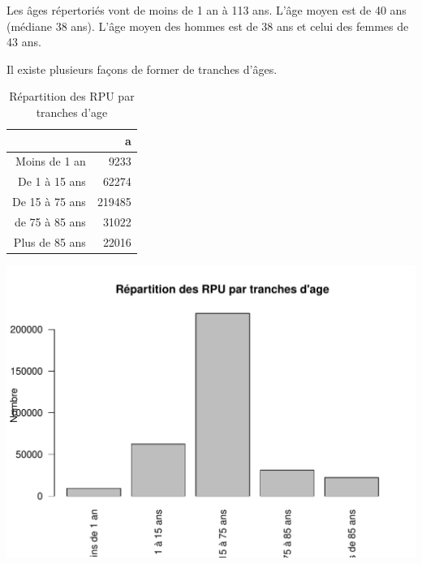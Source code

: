 \documentclass[12pt,english,french,twoside]{book}\usepackage[]{graphicx}\usepackage[]{color}
\makeatletter
\def\maxwidth{ %
  \ifdim\Gin@nat@width>\linewidth
    \linewidth
  \else
    \Gin@nat@width
  \fi
}
\newenvironment{knitrout}{}{} %
\makeatother
\begin{document}
Les âges répertoriés vont de moins de 1 an à 113 ans. L'âge moyen est de 40 ans (médiane 38 ans). L'âge moyen des hommes est de 38 ans et celui des femmes de 43 ans.

Il existe plusieurs façons de former de tranches d'âges.


\begin{table}[ht]
\centering
\begin{tabular}{rr}
  \hline
 & a \\ 
  \hline
Moins de 1 an & 9233 \\ 
  De 1 à 15 ans & 62274 \\ 
  De 15 à 75 ans & 219485 \\ 
  de 75 à 85 ans & 31022 \\ 
  Plus de 85 ans & 22016 \\ 
   \hline
\end{tabular}
\caption[Répartition des RPU par tranches d'age]{Répartition des RPU par tranches d'age} 
\label{tab:tranche}
\end{table}



\begin{center}
\begin{knitrout}
\color{fgcolor}
\includegraphics[width=\maxwidth]{figure/tranches_age1} 

\end{knitrout}

\label{fig:tranches_age1}
\end{center}
\end{document}
